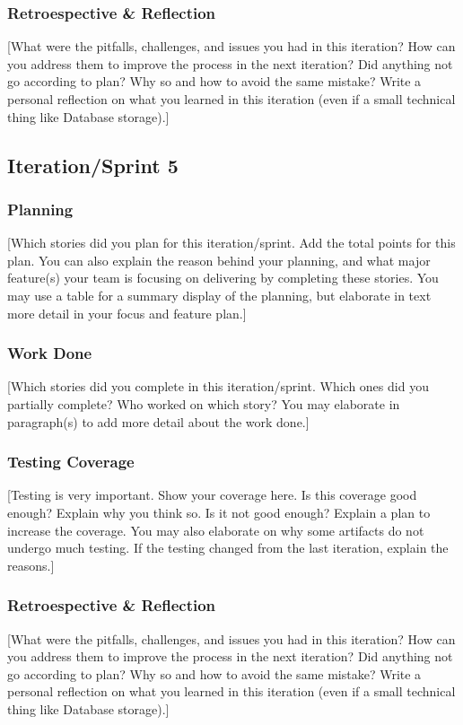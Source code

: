\documentclass{article}
\begin{document}
\subsubsection{Retroespective \& Reflection}
[What were the pitfalls, challenges, and issues you had in this iteration? How can you address them to improve the process in the next iteration? Did anything not go according to plan? Why so and how to avoid the same mistake? Write a personal reflection on what you learned in this iteration (even if a small technical thing like Database storage).]

\subsection{Iteration/Sprint 5}
\subsubsection{Planning}
[Which stories did you plan for this iteration/sprint. Add the total points for this plan. You can also explain the reason behind your planning, and what major feature(s) your team is focusing on delivering by completing these stories. You may use a table for a summary display of the planning, but elaborate in text more detail in your focus and feature plan.]

\subsubsection{Work Done}
[Which stories did you complete in this iteration/sprint. Which ones did you partially complete? Who worked on which story? You may elaborate in paragraph(s) to add more detail about the work done.]

\subsubsection{Testing Coverage}
[Testing is very important. Show your coverage here. Is this coverage good enough? Explain why you think so. Is it not good enough? Explain a plan to increase the coverage. You may also elaborate on why some artifacts do not undergo much testing. If the testing changed from the last iteration, explain the reasons.]

\subsubsection{Retroespective \& Reflection}
[What were the pitfalls, challenges, and issues you had in this iteration? How can you address them to improve the process in the next iteration? Did anything not go according to plan? Why so and how to avoid the same mistake? Write a personal reflection on what you learned in this iteration (even if a small technical thing like Database storage).]
\end{document}
